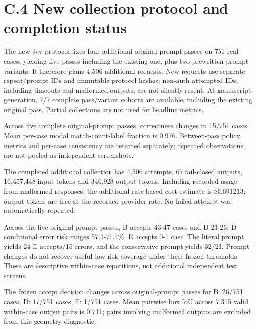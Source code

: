 \documentclass[10pt]{article}
\begin{document}
\section*{C.4 New collection protocol and completion status}
The new Jev protocol fixes four additional original-prompt passes on 751 real cases, yielding five passes including the existing one, plus two prewritten prompt variants. It therefore plans 4,506 additional requests. New requests use separate repeat/prompt IDs and immutable protocol hashes; non-auth attempted IDs, including timeouts and malformed outputs, are not silently resent. At manuscript generation, 7/7 complete pass/variant cohorts are available, including the existing original pass. Partial collections are not used for headline metrics.

Across five complete original-prompt passes, correctness changes in 15/751 cases. Mean per-case modal match-count-label fraction is 0.976. Between-pass policy metrics and per-case consistency are retained separately; repeated observations are not pooled as independent screenshots.

The completed additional collection has 4,506 attempts, 67 fail-closed outputs, 16,457,448 input tokens and 346,928 output tokens. Including recorded usage from malformed responses, the additional rate-based cost estimate is \$0.691213; output tokens are free at the recorded provider rate. No failed attempt was automatically repeated.

Across the five original-prompt passes, B accepts 43-47 cases and D 21-26; D conditional error risk ranges 57.1-71.4\%. E accepts 0-1 case. The literal prompt yields 24 D accepts/15 errors, and the conservative prompt yields 32/23. Prompt changes do not recover useful low-risk coverage under these frozen thresholds. These are descriptive within-case repetitions, not additional independent test screens.

The frozen accept decision changes across original-prompt passes for B: 26/751 cases, D: 17/751 cases, E: 1/751 cases. Mean pairwise box IoU across 7,315 valid within-case output pairs is 0.711; pairs involving malformed outputs are excluded from this geometry diagnostic.
\end{document}

